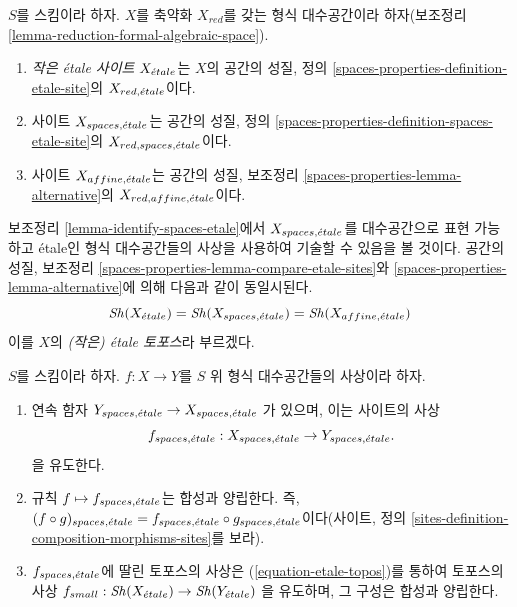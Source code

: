 \begin{definition}
\label{definition-etale-sites}
$S$를 스킴이라 하자. $X$를 축약화 $X_{red}$를 갖는 형식
대수공간이라 하자(보조정리
\ref{lemma-reduction-formal-algebraic-space}).
\begin{enumerate}
\item {\it 작은 \'etale 사이트} $X_{\acute{e}tale}$는 $X$의
공간의 성질, 정의
\ref{spaces-properties-definition-etale-site}의
$X_{red, {\acute{e}tale}}$이다.
\item 사이트 $X_{spaces, {\acute{e}tale}}$는 공간의 성질, 정의
\ref{spaces-properties-definition-spaces-etale-site}의
$X_{red, spaces, {\acute{e}tale}}$이다.
\item 사이트 $X_{affine, {\acute{e}tale}}$는 공간의 성질, 보조정리
\ref{spaces-properties-lemma-alternative}의
$X_{red, affine, {\acute{e}tale}}$이다.
\end{enumerate}
\end{definition}

\noindent
보조정리 \ref{lemma-identify-spaces-etale}에서
$X_{spaces, {\acute{e}tale}}$를 대수공간으로 표현 가능하고 \'etale인
형식 대수공간들의 사상을 사용하여 기술할 수 있음을 볼 것이다.
공간의 성질, 보조정리
\ref{spaces-properties-lemma-compare-etale-sites}와
\ref{spaces-properties-lemma-alternative}에 의해 다음과 같이 동일시된다.
\begin{equation}
\label{equation-etale-topos}
\mathop{\mathit{Sh}}\nolimits(X_{\acute{e}tale}) = \mathop{\mathit{Sh}}\nolimits(X_{spaces, {\acute{e}tale}}) = \mathop{\mathit{Sh}}\nolimits(X_{affine, {\acute{e}tale}})
\end{equation}
이를 $X$의 {\it (작은) \'etale 토포스}라 부르겠다.

\begin{lemma}
\label{lemma-functoriality-etale-site}
$S$를 스킴이라 하자.
$f : X \to Y$를 $S$ 위 형식 대수공간들의 사상이라 하자.
\begin{enumerate}
\item 연속 함자
$Y_{spaces, {\acute{e}tale}} \to X_{spaces, {\acute{e}tale}}$
가 있으며, 이는 사이트의 사상
$$
f_{spaces, {\acute{e}tale}} : X_{spaces, {\acute{e}tale}} \to Y_{spaces, {\acute{e}tale}}.
$$
을 유도한다.
\item 규칙 $f \mapsto f_{spaces, {\acute{e}tale}}$는 합성과 양립한다. 즉,
$(f \circ g)_{spaces, {\acute{e}tale}}
= f_{spaces, {\acute{e}tale}} \circ g_{spaces, {\acute{e}tale}}$이다(사이트, 정의
\ref{sites-definition-composition-morphisms-sites}를 보라).
\item $f_{spaces, {\acute{e}tale}}$에 딸린 토포스의 사상은
(\ref{equation-etale-topos})를 통하여 토포스의 사상
$f_{small} : \mathop{\mathit{Sh}}\nolimits(X_{\acute{e}tale}) \to \mathop{\mathit{Sh}}\nolimits(Y_{\acute{e}tale})$
을 유도하며, 그 구성은 합성과 양립한다.
\end{enumerate}
\end{lemma}

